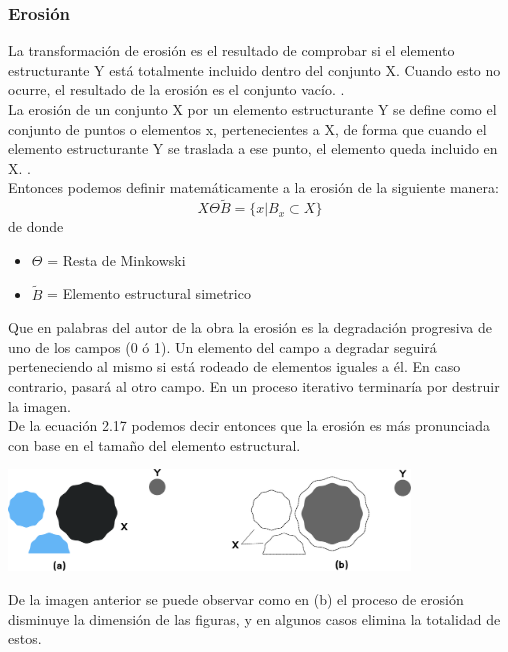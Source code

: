\subsubsection{Erosión}
La transformación de erosión es el resultado de comprobar si el elemento estructurante
Y está totalmente incluido dentro del conjunto X. Cuando esto no ocurre, el resultado de la
erosión es el conjunto vacío. \cite{10045_10053}.\\
La erosión de un conjunto X por un elemento estructurante Y se define como el conjunto
de puntos o elementos x, pertenecientes a X, de forma que cuando el elemento estructurante Y se
traslada a ese punto, el elemento queda incluido en X. \cite{10045_10053}.\\
Entonces podemos definir matemáticamente a la erosión de la siguiente manera:
\begin{equation}
	X \Theta \tilde{B} = \{ x|B_x \subset X \}
\end{equation}
de donde
\begin{itemize}
	\item $\Theta$ = Resta de Minkowski
	\item $\tilde{B}$ = Elemento estructural simetrico
\end{itemize}
Que en palabras del autor de la obra \cite{Book:Arturo2011} la erosión es la degradación progresiva de uno de los campos (0 ó 1). Un elemento del
campo a degradar seguirá perteneciendo al mismo si está rodeado de elementos iguales
a él. En caso contrario, pasará al otro campo. En un proceso iterativo terminaría por
destruir la imagen.\\
De la ecuación 2.17 podemos decir entonces que la erosión es más pronunciada con base en el tamaño del elemento estructural.
\begin{center}
	\includegraphics[width=0.8\textwidth]{Contenido/Cuerpo/Capitulo2/Fig14.eps}
	\label{fig:MarcoTeorico:Fig23}
\end{center}
De la imagen anterior se puede observar como en (b) el proceso de erosión disminuye la dimensión de las figuras, y en algunos casos elimina la totalidad de estos.

